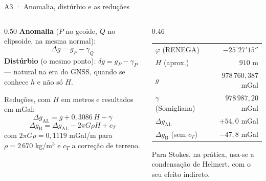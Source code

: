 \documentclass[aspectratio=169,11pt]{beamer}
\begin{document}
\begin{frame}{A3 · Anomalia, distúrbio e as reduções}
  \small
  \begin{columns}[T]
    \begin{column}{0.50\textwidth}
      \textbf{Anomalia} ($P$ no geoide, $Q$ no elipsoide, na mesma normal):
      \[ \Delta g = g_P - \gamma_Q \]
      \textbf{Distúrbio} (o mesmo ponto): $\delta g = g_P - \gamma_P$ --- natural na era do
      GNSS, quando se conhece $h$ e não só $H$.
      \medskip

      Reduções, com $H$ em metros e resultados em mGal:
      \[ \Delta g_{\mathrm{AL}} = g + 0{,}3086\,H - \gamma \]
      \[ \Delta g_{\mathrm{B}} = \Delta g_{\mathrm{AL}} - 2\pi G\rho H + c_T \]
      com $2\pi G\rho = 0{,}1119$ mGal/m para $\rho = 2\,670$ kg/m$^3$ e $c_T$ a correção de
      terreno.
    \end{column}
    \begin{column}{0.46\textwidth}
      \begin{ideia}[title={Curitiba, com mais casas}]
        \scriptsize
        \renewcommand{\arraystretch}{1.2}
        \begin{tabular}{@{}lr@{}}
          $\varphi$ (RENEGA) & $-25^{\circ}27'15''$ \\
          $H$ (aprox.) & $910$ m \\
          $g$ & $978\,760{,}387$ mGal \\
          $\gamma$ (Somigliana) & $978\,987{,}20$ mGal \\
          $\Delta g_{\mathrm{AL}}$ & $+54{,}0$ mGal \\
          $\Delta g_{\mathrm{B}}$ (sem $c_T$) & $-47{,}8$ mGal \\
        \end{tabular}
      \end{ideia}
      \medskip
      {\scriptsize Para Stokes, na prática, usa-se a condensação de Helmert, com o seu efeito
      indireto.}
    \end{column}
  \end{columns}
\end{frame}
\end{document}
